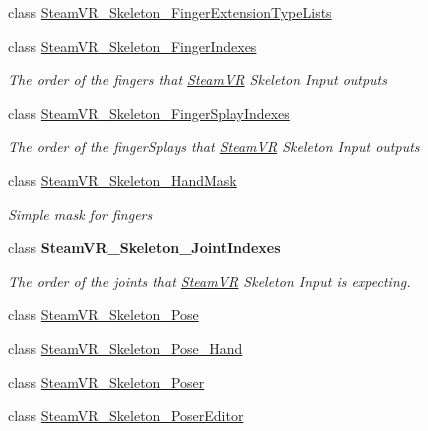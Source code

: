 \begin{DoxyCompactItemize}
\item 
class \mbox{\hyperlink{class_valve_1_1_v_r_1_1_steam_v_r___skeleton___finger_extension_type_lists}{Steam\+V\+R\+\_\+\+Skeleton\+\_\+\+Finger\+Extension\+Type\+Lists}}
\item 
class \mbox{\hyperlink{class_valve_1_1_v_r_1_1_steam_v_r___skeleton___finger_indexes}{Steam\+V\+R\+\_\+\+Skeleton\+\_\+\+Finger\+Indexes}}
\begin{DoxyCompactList}\small\item\em The order of the fingers that \mbox{\hyperlink{class_valve_1_1_v_r_1_1_steam_v_r}{Steam\+VR}} Skeleton Input outputs \end{DoxyCompactList}\item 
class \mbox{\hyperlink{class_valve_1_1_v_r_1_1_steam_v_r___skeleton___finger_splay_indexes}{Steam\+V\+R\+\_\+\+Skeleton\+\_\+\+Finger\+Splay\+Indexes}}
\begin{DoxyCompactList}\small\item\em The order of the finger\+Splays that \mbox{\hyperlink{class_valve_1_1_v_r_1_1_steam_v_r}{Steam\+VR}} Skeleton Input outputs \end{DoxyCompactList}\item 
class \mbox{\hyperlink{class_valve_1_1_v_r_1_1_steam_v_r___skeleton___hand_mask}{Steam\+V\+R\+\_\+\+Skeleton\+\_\+\+Hand\+Mask}}
\begin{DoxyCompactList}\small\item\em Simple mask for fingers \end{DoxyCompactList}\item 
class {\bfseries Steam\+V\+R\+\_\+\+Skeleton\+\_\+\+Joint\+Indexes}
\begin{DoxyCompactList}\small\item\em The order of the joints that \mbox{\hyperlink{class_valve_1_1_v_r_1_1_steam_v_r}{Steam\+VR}} Skeleton Input is expecting. \end{DoxyCompactList}\item 
class \mbox{\hyperlink{class_valve_1_1_v_r_1_1_steam_v_r___skeleton___pose}{Steam\+V\+R\+\_\+\+Skeleton\+\_\+\+Pose}}
\item 
class \mbox{\hyperlink{class_valve_1_1_v_r_1_1_steam_v_r___skeleton___pose___hand}{Steam\+V\+R\+\_\+\+Skeleton\+\_\+\+Pose\+\_\+\+Hand}}
\item 
class \mbox{\hyperlink{class_valve_1_1_v_r_1_1_steam_v_r___skeleton___poser}{Steam\+V\+R\+\_\+\+Skeleton\+\_\+\+Poser}}
\item 
class \mbox{\hyperlink{class_valve_1_1_v_r_1_1_steam_v_r___skeleton___poser_editor}{Steam\+V\+R\+\_\+\+Skeleton\+\_\+\+Poser\+Editor}}

\end{DoxyCompactItemize}
